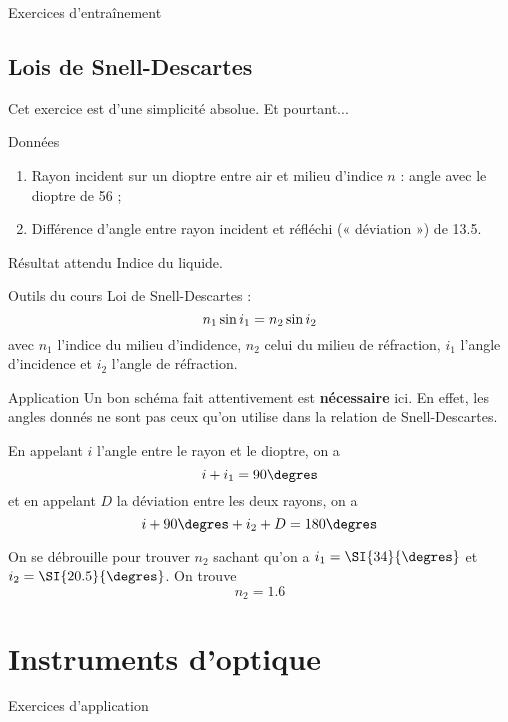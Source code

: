 \documentclass[10pt,a5paper,notitlepage]{book}
\begin{document}
\begin{center}
    \Huge Exercices d'entraînement
\end{center}

\setcounter{section}{5}
\section{Lois de Snell-Descartes}
Cet exercice est d'une simplicité absolue. Et pourtant...
\begin{NCdefi}{Données}
    \begin{enumerate}
        \item Rayon incident sur un dioptre entre air et milieu d'indice $n$ :
            angle {\huge avec le dioptre} de \SI{56}{\degres} ;
        \item Différence d'angle entre rayon incident et réfléchi (« déviation
            ») de \SI{13.5}{\degres}.
    \end{enumerate}
\end{NCdefi}

\begin{NCprop}{Résultat attendu}
    Indice du liquide.
\end{NCprop}

\begin{NCdemo}{Outils du cours}
    Loi de Snell-Descartes :
    \[ n_1\ss i_1 = n_2 \ss i_2 \]
    avec $n_1$ l'indice du milieu d'indidence, $n_2$ celui du milieu de
    réfraction, $i_1$ l'angle d'incidence et $i_2$ l'angle de réfraction.
\end{NCdemo}

\begin{NCexem}{Application}
    Un bon schéma fait attentivement est \textbf{nécessaire} ici. En effet,
    les angles donnés ne sont pas ceux qu'on utilise dans la relation de
    Snell-Descartes. \bigbreak
    
    En appelant $i$ l'angle entre le rayon et le dioptre, on a
    \[ i + i_1 = 90\degres\]
    et en appelant $D$ la déviation entre les deux rayons, on a
    \[ i + 90\degres + i_2 + D = 180\degres\]

    On se débrouille pour trouver $n_2$ sachant qu'on a $i_1 = \SI{34}{\degres}$
    et $i_2 = \SI{20.5}{\degres}$. On trouve
    \[ \boxed{n_2 = 1.6} \]
\end{NCexem}

\chapter{Instruments d'optique}
\vspace*{-47pt}
\begin{center}
    \Huge Exercices d'application
\end{center}
\end{document}
